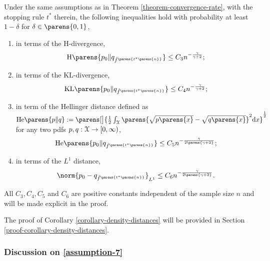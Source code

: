 \begin{corollary}\label{corollary-density-distances}
	Under the same assumptions as in Theorem \ref{theorem-convergence-rate}, with the stopping rule $t^*$ therein, the following inequalities hold with probability at least $1 - \delta$ for $\delta \in \parens{0, 1}$, 
	\begin{enumerate}[label=(\alph*)]
		\item \label{corollary-density-distances-a} in terms of the H-divergence, 
		\begin{align*}
			\Hdiv \parens{p_0 \Vert q_{\hat{f}^{\parens{t^* \parens{n}}}} } \le C_3  n^{-\frac{\gamma}{\gamma + 2}}; 
		\end{align*}
		\item \label{corollary-density-distances-b} in terms of the KL-divergence, 
		\begin{align*}
			\KLdiv \parens{p_0 \Vert q_{\hat{f}^{\parens{t^* \parens{n}}}} } \le C_4 n^{-\frac{\gamma}{\gamma + 2}}; 
		\end{align*}
		\item \label{corollary-density-distances-c} in term of the Hellinger distance defined as $\mathrm{He} \parens{p \Vert q} := \parens[\big]{\frac{1}{2} \int_{\calX} \parens{\sqrt{p \parens{x}} - \sqrt{q \parens{x}}}^2 \diff x}^{\frac{1}{2}}$ for any two pdfs $p, q: \mathcal{X} \to [0, \infty)$, 
		\begin{align*}
			\mathrm{He} \parens{p_0 \Vert q_{\hat{f}^{\parens{t^* \parens{n}}}} } \le C_5 n^{-\frac{\gamma}{2 \parens{\gamma + 2}}}; 
		\end{align*}
		\item \label{corollary-density-distances-d} in terms of the $L^1$ distance, 
		\begin{align*}
			\norm{p_0 - q_{\hat{f}^{\parens{t^* \parens{n}}}} }_{L^1} \le C_6 n^{-\frac{\gamma}{2 \parens{\gamma + 2}}}. 
		\end{align*}
	\end{enumerate}
	All $C_3, C_4, C_5$ and $C_6$ are positive constants independent of the sample size $n$ and will be made explicit in the proof. 
\end{corollary}

The proof of Corollary \ref{corollary-density-distances} will be provided in Section \ref{proof-corollary-density-distances}. 

\subsubsection{Discussion on \ref{assumption-7}}


